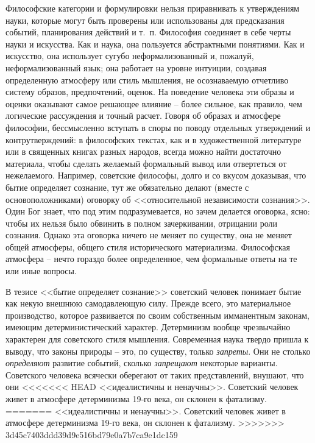 \documentclass{book}
\begin{document}
Философские категории и формулировки нельзя приравнивать к утверждениям науки, которые могут быть проверены или использованы для 
предсказания событий, планирования действий и т.~п. Философия соединяет в себе черты науки и искусства. Как и наука, она 
пользуется абстрактными понятиями. Как и искусство, она использует сугубо неформализован­ный и, пожалуй, неформализованный язык; 
она работает на уров­не интуиции, создавая определенную атмосферу или стиль мышления, не осознаваемую отчетливо систему образов, 
предпочтений, оценок. На поведение человека эти образы и оценки оказывают самое решающее влияние -- более сильное, как правило, 
чем логические рассуждения и точный расчет. Говоря об об­разах и атмосфере философии, бессмысленно вступать в споры по поводу 
отдельных утверждений и контрутверждений: в философских текстах, как и в художественной литературе или в священных книгах разных 
народов, всегда можно найти достаточно материала, чтобы сделать желаемый формальный вывод или отвертеться от нежелаемого. 
Например, советские философы, долго и со вкусом доказывая, что бытие определяет сознание, тут же обязательно делают (вместе с 
основоположника­ми) оговорку об <<относительной независимости сознания>>. Один Бог знает, что под этим подразумевается, но зачем 
делается оговорка, ясно: чтобы их нельзя было обвинить в полном зачеркивании, отрицании роли сознания. Однако эта оговорка 
ничего не меняет по существу, она не меняет общей атмосферы, общего стиля исторического материализма. Философская атмосфера -- 
нечто гораздо более определенное, чем формальные ответы на те или иные вопросы.

В тезисе <<бытие определяет сознание>> советский человек понимает бытие как некую внешнюю самодавлеющую силу. Прежде всего, это 
материальное производство, которое раз­вивается по своим собственным имманентным законам, имею­щим детерминистический характер. 
Детерминизм вообще чрезвычайно характерен для советского стиля мышления. Современная наука твердо пришла к выводу, что законы 
природы -- это, по существу, только \textit{запреты}.  Они не столько \textit{определяют} развитие событий, сколько 
\textit{запрещают}  некоторые варианты. Советского человека всячески оберегают от таких представле­ний, внушают, что они 
<<<<<<< HEAD
<<идеалистичны и ненаучны>>. Советский человек живет в атмосфере детерминизма 19‑го века, он склонен к фатализму.
=======
<<идеалистичны и ненаучны>>. Советский человек живет в атмосфере детерминизма 19-го века, он склонен к фатализму.
>>>>>>> 3d45c7403ddd39d9e516bd79e0a7b7ca9e1dc159
\end{document}
